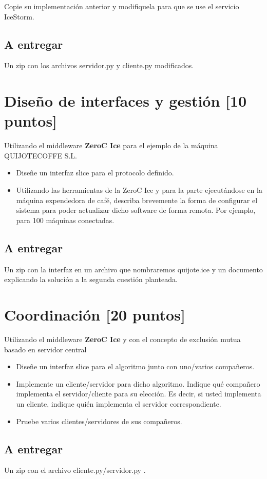 Copie su implementación anterior y modifiquela para que se use el
servicio IceStorm.

\subsection{A entregar}
Un zip con los archivos servidor.py y cliente.py modificados.

\section{Diseño de interfaces y gestión [10 puntos]}
Utilizando el middleware \textbf{ZeroC Ice} para el ejemplo de la máquina QUIJOTECOFFE S.L.  
\begin{itemize}
	\item Diseñe un interfaz slice para el protocolo definido.
	\item Utilizando las herramientas de la ZeroC Ice y para la parte ejecutándose en la máquina expendedora de café, describa brevemente la forma de configurar el sistema para poder actualizar dicho software de forma remota. Por ejemplo, para 100 máquinas conectadas. 
\end{itemize}

\subsection{A entregar}
Un zip con la interfaz en un archivo que nombraremos quijote.ice y un documento explicando la solución a la segunda cuestión planteada.

\section{Coordinación [20 puntos]}
Utilizando el middleware \textbf{ZeroC Ice} y con el concepto de exclusión mutua basado en servidor central  
\begin{itemize}
	\item Diseñe un interfaz slice para el algoritmo junto con uno/varios compañeros.
	\item Implemente un cliente/servidor para dicho algoritmo. Indique qué compañero implementa el servidor/cliente para su elección. Es decir, si usted implementa un cliente, indique quién implementa el servidor correspondiente.
	\item Pruebe varios clientes/servidores de sus compañeros. 
\end{itemize}

\subsection{A entregar}
Un zip con el archivo cliente.py/servidor.py .
